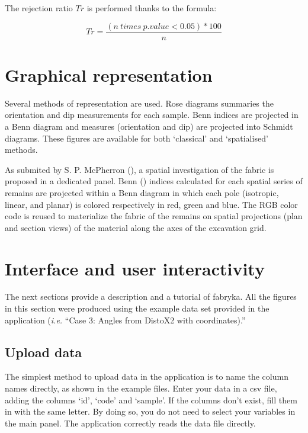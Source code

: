 \documentclass[
]{article}
\begin{document}
The rejection ratio \(Tr\) is performed thanks to the formula:

\[Tr = \frac{(n~times~p.value < 0.05)* 100}{n}\]

\section{Graphical representation}\label{graphical-representation}

Several methods of representation are used. Rose diagrams summaries the
orientation and dip measurements for each sample. Benn indices are
projected in a Benn diagram and measures (orientation and dip) are
projected into Schmidt diagrams. These figures are available for both
`classical' and `spatialised' methods.

As submited by S. P. McPherron (), a
spatial investigation of the fabric is proposed in a dedicated panel.
Benn () indices calculated for each spatial
series of remains are projected within a Benn diagram in which each pole
(isotropic, linear, and planar) is colored respectively in red, green
and blue. The RGB color code is reused to materialize the fabric of the
remains on spatial projections (plan and section views) of the material
along the axes of the excavation grid. \bigbreak

\section{Interface and user
interactivity}\label{interface-and-user-interactivity}

The next sections provide a description and a tutorial of fabryka. All
the figures in this section were produced using the example data set
provided in the application (\emph{i.e.} ``Case 3: Angles from DistoX2
with coordinates).''

\subsection{Upload data}\label{upload-data}

The simplest method to upload data in the application is to name the
column names directly, as shown in the example files. Enter your data in
a csv file, adding the columns `id', `code' and `sample'. If the columns
don't exist, fill them in with the same letter. By doing so, you do not
need to select your variables in the main panel. The application
correctly reads the data file directly.
\end{document}
